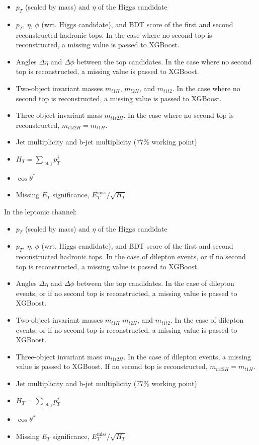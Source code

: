 \begin{itemize}
\item $p_{T}$ (scaled by mass) and $\eta$ of the Higgs candidate
\item $p_{T}$, $\eta$, $\phi$ (wrt. Higgs candidate), and BDT score of the first and second reconstructed hadronic tops. In the case where no second top is reconstructed, a missing value is passed to XGBoost.
\item Angles $\Delta\eta$ and $\Delta\phi$ between the top candidates. In the case where no second top is reconstructed, a missing value is passed to XGBoost.
\item Two-object invariant masses $m_{t1H}$, $m_{t2H}$, and $m_{t1t2}$. In the case where no second top is reconstructed, a missing value is passed to XGBoost.
\item Three-object invariant mass $m_{t1t2H}$. In the case where no second top is reconstructed, $m_{t1t2H} = m_{t1H}$.
\item Jet multiplicity and b-jet multiplicity (77\% working point)
\item $H_{T} = \sum_\text{jet j} p^{j}_{T}$
\item $\cos\theta^{*}$
\item Missing $E_{T}$ significance, $E_{T}^\text{miss}/\sqrt{H_{T}}$
\end{itemize}

In the leptonic channel: 

\begin{itemize} 
\item $p_{T}$ (scaled by mass) and $\eta$ of the Higgs candidate
\item $p_{T}$, $\eta$, $\phi$ (wrt. Higgs candidate), and BDT score of the first and second reconstructed hadronic tops. In the case of dilepton events, or if no second top is reconstructed, a missing value is passed to XGBoost.
\item Angles $\Delta\eta$ and $\Delta\phi$ between the top candidates. In the case of dilepton events, or if no second top is reconstructed, a missing value is passed to XGBoost.
\item Two-object invariant masses $m_{t1H}$ $m_{t2H}$, and $m_{t1t2}$. In the case of dilepton events, or if no second top is reconstructed, a missing value is passed to XGBoost.
\item Three-object invariant mass $m_{t1t2H}$. In the case of dilepton events, a missing value is passed to XGBoost. If no second top is reconstructed, $m_{t1t2H} = m_{t1H}$.
\item Jet multiplicity and b-jet multiplicity (77\% working point)
\item $H_{T} = \sum_\text{jet j} p^{j}_{T}$
\item $\cos\theta^{*}$
\item Missing $E_{T}$ significance, $E_{T}^\text{miss}/\sqrt{H_{T}}$
\end{itemize} 

